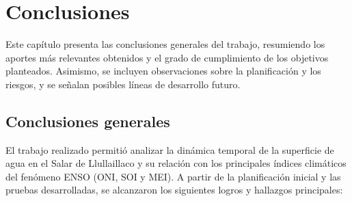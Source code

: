 
\chapter{Conclusiones} %

\label{Chapter5} %
Este capítulo presenta las conclusiones generales del trabajo, resumiendo los aportes más relevantes obtenidos y el grado de cumplimiento de los objetivos planteados. Asimismo, se incluyen observaciones sobre la planificación y los riesgos, y se señalan posibles líneas de desarrollo futuro. 


\section{Conclusiones generales }

El trabajo realizado permitió analizar la dinámica temporal de la superficie de agua en el Salar de Llullaillaco y su relación con los principales índices climáticos del fenómeno ENSO (ONI, SOI y MEI). A partir de la planificación inicial y las pruebas desarrolladas, se alcanzaron los siguientes logros y hallazgos principales:

